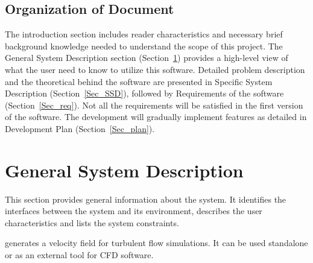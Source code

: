\documentclass[12pt]{article}
\begin{document}

\subsection{Organization of Document}
The introduction section includes reader characteristics and necessary brief background knowledge needed to understand the scope of this project. The General System Description section (Section~\ref{Sec_GSD}) provides a high-level view of what the user need to know to utilize this software. Detailed problem description and the theoretical behind the software are presented in Specific System Description (Section~\ref{Sec_SSD}), followed by Requirements of the software (Section~\ref{Sec_req}). Not all the requirements will be satisfied in the first version of the software. The development will gradually implement features as detailed in Development Plan (Section~\ref{Sec_plan}).


\section{General System Description} \label{Sec_GSD}

This section provides general information about the system.  It identifies the
interfaces between the system and its environment, describes the user
characteristics and lists the system constraints.  

\progname{} generates a velocity field for turbulent flow simulations. It can be used standalone or as an external tool for CFD software.

\end{document}
